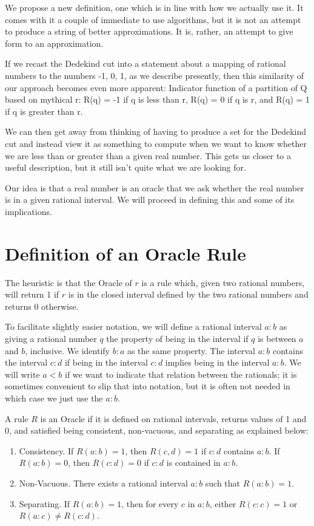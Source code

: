 \documentclass[12pt]{article}
\begin{document}
We propose a new definition, one which is in line with how we actually use it.
It comes with it a couple of immediate to use algorithms, but it is not an
attempt to produce a string of better approximations. It is, rather, an
attempt to give form to an approximation.

If we recast the Dedekind cut into a statement about a mapping of rational
numbers to the numbers -1, 0, 1, as we describe presently, then this
similarity of our approach becomes even more apparent: 
Indicator function of a partition of Q based on mythical r: 
R(q) = -1 if q is less than r, R(q) = 0 if q is r, and R(q) = 1 if q is
greater than r. 

We can then get away from thinking of having to produce a set for the Dedekind
cut and instead view it as something to compute when we want to know whether
we are less than or greater than a given real number. This gets us closer to a
useful description, but it still isn't quite what we are looking for. 

Our idea is that a real number is an oracle that we ask whether the real
number is in a given rational interval. We will proceed in defining this and
some of its implications. 



\section{Definition of an Oracle Rule}\label{sec:ora}

The heuristic is that the Oracle of $r$ is a rule which, given two rational numbers, will return 1 if
$r$ is in the closed interval defined by the two rational numbers and returns 0
otherwise. 

To facilitate slightly easier notation, we will define a rational interval $a:b$ as giving a rational number $q$ the property of being in the interval if $q$ is between $a$ and $b$, inclusive. We identify $b:a$ as the same property. The interval $a:b$ contains the interval $c:d$ if being in the interval $c:d$ implies being in the interval $a:b$. We will write $a<b$ if we want to indicate that relation between the rationals; it is sometimes convenient to slip that into notation, but it is often not needed in which case we just use the $a:b$.

A rule $R$ is an Oracle if it is defined on rational intervals, returns values of 1
and 0, and satisfied being consistent, non-vacuous, and separating
as explained below: 
\begin{enumerate}
    \item Consistency. If $R(a:b) = 1$, then $R(c,d) = 1$ if $c:d$ contains $a:b$. If $R(a:b)= 0$, then $R(c:d)=0$ if $c:d$ is contained in $a:b$.
    \item Non-Vacuous. There exists a rational interval $a:b$ such that $R(a:b) = 1$.
    \item Separating. If $R(a:b)=1$, then for every $c$ in $a:b$, either $R(c:c) = 1$ or $R(a:c) \neq R(c:d)$.
\end{enumerate}
\end{document}
